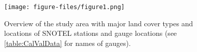 \documentclass[water,article,submit,moreauthors,pdftex,10pt,a4paper]{mdpi}
\theoremstyle{mdpi}
\newcounter{ex}
\newcounter{re}
\theoremstyle{mdpidefinition}
\begin{document}


\renewcommand\bibname{References}










\clearpage

\begin{figure}
\centering
\texttt{[image: figure-files/figure1.png]}
\caption{Overview of the study area with major land cover types and locations of SNOTEL stations and gauge locations (see \cref{table:CalValData} for names of gauges).}
\label{fig:StudySite}
\end{figure}
\clearpage
\end{document}

